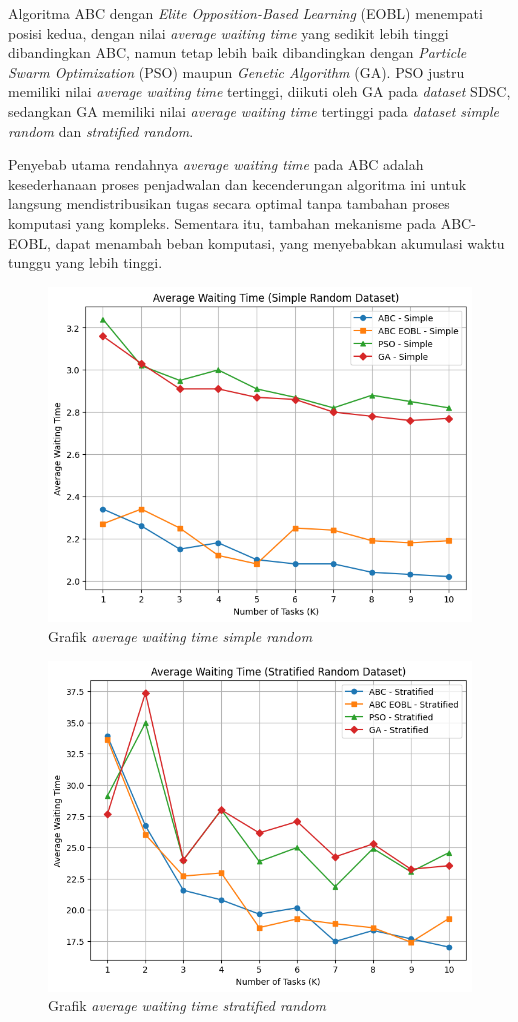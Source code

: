 Algoritma ABC dengan \textit{Elite Opposition-Based Learning} (EOBL) menempati posisi kedua, dengan nilai \textit{average waiting time} yang sedikit lebih tinggi dibandingkan ABC, namun tetap lebih baik dibandingkan dengan \textit{Particle Swarm Optimization} (PSO) maupun \textit{Genetic Algorithm} (GA). PSO justru memiliki nilai \textit{average waiting time} tertinggi, diikuti oleh GA pada \textit{dataset} SDSC, sedangkan GA memiliki nilai \textit{average waiting time} tertinggi pada \textit{dataset simple random} dan \textit{stratified random}.

Penyebab utama rendahnya \textit{average waiting time} pada ABC adalah kesederhanaan proses penjadwalan dan kecenderungan algoritma ini untuk langsung mendistribusikan tugas secara optimal tanpa tambahan proses komputasi yang kompleks. Sementara itu, tambahan mekanisme pada ABC-EOBL, dapat menambah beban komputasi, yang menyebabkan akumulasi waktu tunggu yang lebih tinggi.

\begin{figure} [H]
    \centering
    \includegraphics[width=0.75\linewidth]{gambar/Grafik Average Waiting Time Simple Random.png}
    \caption{Grafik \textit{average waiting time simple random}}
\end{figure}

\newpage

\begin{figure} [H]
    \centering
    \includegraphics[width=0.75\linewidth]{gambar/Grafik Average Waiting Time Stratified Random.png}
    \caption{Grafik \textit{average waiting time stratified random}}
\end{figure}


